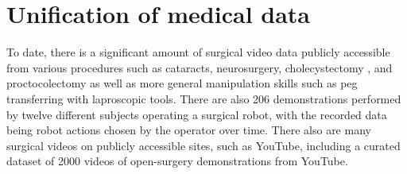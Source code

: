 \documentclass[fleqn,10pt]{wlscirep}\twocolumn
\begin{document}








\section*{Unification of medical data}


To date, there is a significant amount of surgical video data publicly accessible from various procedures such as cataracts\cite{ac97-8m18-21, schoeffmann2018cataract}, neurosurgery\cite{bouget2015detecting}, cholecystectomy \cite{twinanda2016endonet, hong2020cholecseg8k, nwoye2022rendezvous}, and proctocolectomy \cite{maier2021heidelberg, valderrama2022towards} as well as more general manipulation skills such as peg transferring with laproscopic tools\cite{gao2014jhu, madapana2019desk, huaulme2022peg}. 
There are also 206 demonstrations performed by twelve different subjects operating a surgical robot, with the recorded data being robot actions chosen by the operator over time\cite{rivas2023surgical}. 
There also are many surgical videos on publicly accessible sites, such as YouTube, including a curated dataset of 2000 videos of open-surgery demonstrations from YouTube\cite{goodman2021real}.
\end{document}
